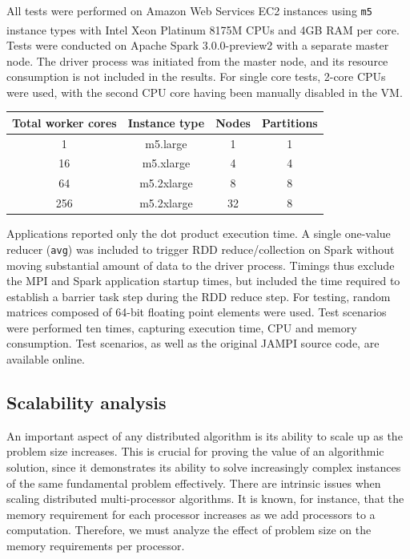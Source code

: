 \documentclass[bdcc,article,submit,moreauthors,pdftex]{Definitions/mdpi}
\begin{document}
All tests were performed on Amazon Web Services EC2 instances using \texttt{m5} instance types with Intel\textsuperscript{\textregistered} Xeon\textsuperscript{\textregistered} Platinum 8175M CPUs and 4GB RAM per core. Tests were conducted on Apache Spark 3.0.0-preview2 with a separate master node. The driver process was initiated from the master node, and its resource consumption is not included in the results. For single core tests, 2-core CPUs were used, with the second CPU core having been manually disabled in the VM.

\begin{center}
	\begin{tabular}{ |c|c|c|c| } 
	 \hline
	 Total worker cores & Instance type & Nodes & Partitions  \\ 
	 \hline\hline
	 1 & m5.large & 1 & 1 \\ 
	 \hline
	 16 & m5.xlarge & 4 & 4 \\ 
	 \hline
	 64 & m5.2xlarge & 8 & 8 \\ 
	 \hline
	 256 & m5.2xlarge & 32 & 8 \\ 
	 \hline
	\end{tabular}
\end{center}
	

Applications reported only the dot product execution time. A single one-value reducer (\texttt{avg}) was included to trigger RDD reduce/collection on Spark without moving substantial amount of data to the driver process. Timings thus exclude the MPI and Spark application startup times, but included the time required to establish a barrier task step during the RDD reduce step. For testing, random matrices composed of 64-bit floating point elements were used. Test scenarios were performed ten times, capturing execution time, CPU and memory consumption. Test scenarios, as well as the original JAMPI source code, are available online.\cite{jampi}


\subsection{Scalability analysis} %
\label{sub:scalability_analysis}


An important aspect of any distributed algorithm is its ability to scale up as the problem size increases. This is crucial for proving the value of an algorithmic solution, since it demonstrates its ability to solve increasingly complex instances of the same fundamental problem effectively. There are intrinsic issues when scaling distributed multi-processor algorithms. It is known, for instance, that the memory requirement for each processor increases as we add processors to a computation. Therefore, we must analyze the effect of problem size on the memory requirements per processor. 
\end{document}
